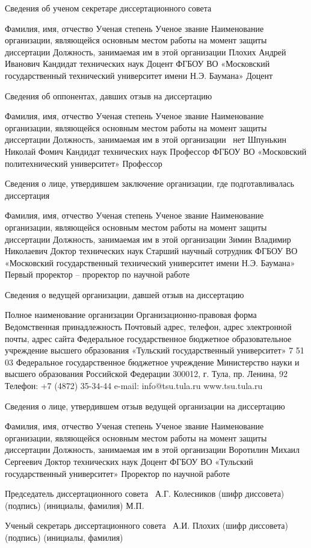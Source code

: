 Сведения об ученом секретаре диссертационного совета

Фамилия, имя, отчество	Ученая степень	Ученое звание	Наименование организации, являющейся основным местом работы на момент защиты диссертации	Должность, занимаемая 
им в этой организации
Плохих Андрей Иванович	Кандидат технических наук	Доцент	ФГБОУ ВО «Московский государственный технический университет имени Н.Э. Баумана»	Доцент

Сведения об оппонентах, давших отзыв на диссертацию

Фамилия, имя, отчество	Ученая степень	Ученое звание	Наименование организации, являющейся основным местом работы на момент защиты диссертации	Должность, занимаемая 
им в этой организации
\opponentOneFio	\opponentOneRegalia\	нет	
Шпунькин Николай Фомич	Кандидат технических наук	Профессор	ФГБОУ ВО «Московский политехнический университет»	Профессор

Сведения о лице, утвердившем заключение организации, где подготавливалась диссертация

Фамилия, имя, отчество	Ученая степень	Ученое звание	Наименование организации, являющейся основным местом работы на момент защиты диссертации	Должность, занимаемая 
им в этой организации
Зимин Владимир Николаевич	Доктор технических наук	Старший научный сотрудник	ФГБОУ ВО «Московский государственный технический университет имени Н.Э. Баумана»	Первый проректор – проректор по научной работе


Сведения о ведущей организации, давшей отзыв на диссертацию

Полное наименование организации	Организационно-правовая форма	Ведомственная 
принадлежность	Почтовый адрес, телефон, 
адрес электронной почты, адрес сайта
Федеральное государственное бюджетное образовательное учреждение высшего образования «Тульский государственный университет»	7 51 03 Федеральное государственное бюджетное учреждение	Министерство науки и высшего образования Российской Федерации	300012, г. Тула, пр. Ленина, 92 
Телефон: +7 (4872) 35-34-44
e-mail: info@tsu.tula.ru
www.tsu.tula.ru

Сведения о лице, утвердившем отзыв ведущей организации на диссертацию

Фамилия, имя, отчество	Ученая степень	Ученое звание	Наименование организации, являющейся основным местом работы на момент защиты диссертации	Должность, занимаемая 
им в этой организации
Воротилин Михаил Сергеевич	Доктор технических наук	Доцент	ФГБОУ ВО «Тульский государственный университет»	Проректор по научной работе


Председатель диссертационного совета	\				А.Г. Колесников
(шифр диссовета)		(подпись)		(инициалы, фамилия)
М.П.

Ученый секретарь диссертационного совета	\				А.И. Плохих
(шифр диссовета)		(подпись)		(инициалы, фамилия)


\clearpage

